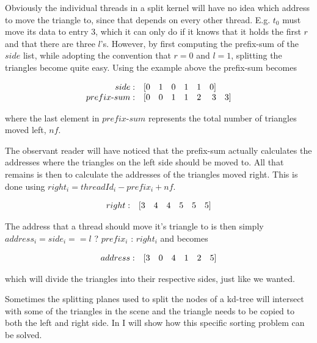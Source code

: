 Obviously the individual threads in a split kernel will have no idea which
address to move the triangle to, since that depends on every other
thread. E.g. $t_0$ must move its data to entry 3, which it can only do if it
knows that it holds the first $r$ and that there are three $l$'s. However, by
first computing the prefix-sum of the $side$ list, while adopting the convention
that $r = 0$ and $l = 1$, splitting the triangles become quite easy. Using the
example above the prefix-sum becomes

\begin{displaymath}
  \begin{array} {r r r r r r r r}
    side: & [0 & 1 & 0 & 1 & 1 & 0]\\
    prefix\text{-}sum: & [0 & 0 & 1 & 1 & 2 & 3 & 3]
  \end{array}
\end{displaymath}

where the last element in $prefix\text{-}sum$ represents the total number of
triangles moved left, $nf$.

The observant reader will have noticed that the prefix-sum actually
calculates the addresses where the triangles on the left side should
be moved to. All that remains is then to calculate the addresses of
the triangles moved right. This is done using $right_i = threadId_i -
prefix_i + nf$.

\begin{displaymath}
  \begin{array} {r r r r r r r}
    right: & [3 & 4 & 4 & 5 & 5 & 5]
  \end{array}
\end{displaymath}

The address that a thread should move it's triangle to is then simply
$address_i = side_i == l$ ? $prefix_i$ : $right_i$ and becomes


\begin{displaymath}
  \begin{array} {r r r r r r r}
    address: & [3 & 0 & 4 & 1 & 2 & 5]
  \end{array}
\end{displaymath}

which will divide the triangles into their respective sides, just like
we wanted.

Sometimes the splitting planes used to split the nodes of a kd-tree will
intersect with some of the triangles in the scene and the triangle needs to be
copied to both the left and right side. In  I will
show how this specific sorting problem can be solved.


